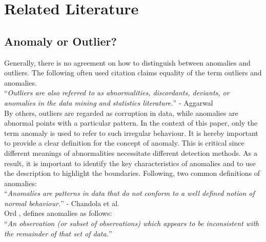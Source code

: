 
\chapter{Related Literature} \label{relatedLiterature} %

\label{2.} %


\section{Anomaly or Outlier?} \label{anomalies}

Generally, there is no agreement on how to distinguish between anomalies and outliers. The following often used citation claims equality of the term outliers and anomalies.\\

\noindent\enquote{\itshape Outliers are also referred to as abnormalities, discordants, deviants, or anomalies in the data mining
	and statistics literature.} - Aggarwal \parencite*{Aggarwal2013}\\

By others, outliers are regarded as corruption in data, while anomalies are abnormal points with a particular pattern. 
In the context of this paper, only the term anomaly is used to refer to such irregular behaviour. It is hereby important to provide a clear definition for the concept of anomaly. This is critical since different meanings of abnormalities necessitate different detection methods. As a result, it is important to identify the key characteristics of anomalies and to use the description to highlight the boundaries. Following, two common definitions of anomalies:\\

\noindent\enquote{\itshape Anomalies are patterns in data that do not conform to a well defined notion of normal behaviour.} - Chandola et al. \parencite*{Chandola2009}\\

Ord \parencite*{Ord1996}, defines anomalies as follows:\\

\noindent\enquote{\itshape An observation (or subset of observations) which appears to be inconsistent with the remainder of that set of data.}\\

